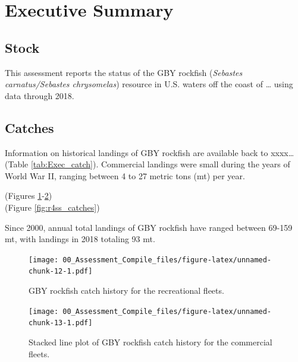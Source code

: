 \documentclass[12pt,]{article}
\begin{document}
{
\setcounter{tocdepth}{4}
\tableofcontents
}
\setlength{\parskip}{5mm plus1mm minus1mm} \pagebreak

\setcounter{page}{1} \renewcommand{\thefigure}{\alph{figure}}
\renewcommand{\thetable}{\alph{table}}

\section*{Executive Summary}\label{executive-summary}

\subsection*{Stock}\label{stock}

This assessment reports the status of the GBY rockfish
(\emph{Sebastes carnatus/Sebastes chrysomelas}) resource in U.S. waters
off the coast of \ldots{} using data through 2018.

\subsection*{Catches}\label{catches}

Information on historical landings of GBY rockfish are available back to
xxxx\ldots{} (Table \ref{tab:Exec_catch}). Commercial landings were
small during the years of World War II, ranging between 4 to 27 metric
tons (mt) per year.

(Figures \ref{fig:Exec_catch1}-\ref{fig:Exec_catch2})\\
(Figure \ref{fig:r4ss_catches})

Since 2000, annual total landings of GBY rockfish have ranged between
69-159 mt, with landings in 2018 totaling 93 mt.

\FloatBarrier

\begin{figure}
\centering
\texttt{[image: 00\_Assessment\_Compile\_files/figure-latex/unnamed-chunk-12-1.pdf]}
\caption{GBY rockfish catch history for the recreational fleets.
\label{fig:Exec_catch1}}
\end{figure}

\begin{figure}
\centering
\texttt{[image: 00\_Assessment\_Compile\_files/figure-latex/unnamed-chunk-13-1.pdf]}
\caption{Stacked line plot of GBY rockfish catch history for the
commercial fleets. \label{fig:Exec_catch2}}
\end{figure}
\end{document}
